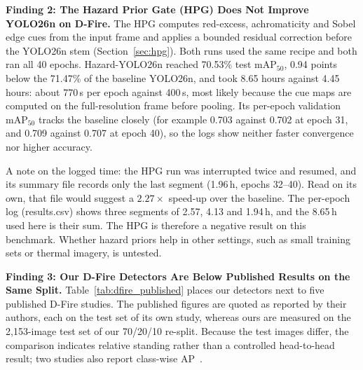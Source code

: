 \documentclass[journal]{IEEEtran}
\begin{document}
\textbf{Finding 2: The Hazard Prior Gate (HPG) Does Not Improve YOLO26n on D-Fire.}
The HPG computes red-excess, achromaticity and Sobel edge cues from the input frame and applies a bounded residual correction before the YOLO26n stem (Section~\ref{sec:hpg}). Both runs used the same recipe and both ran all 40 epochs. Hazard-YOLO26n reached 70.53\% test mAP$_{50}$, 0.94 points below the 71.47\% of the baseline YOLO26n, and took 8.65 hours against 4.45 hours: about 770\,s per epoch against 400\,s, most likely because the cue maps are computed on the full-resolution frame before pooling. Its per-epoch validation mAP$_{50}$ tracks the baseline closely (for example 0.703 against 0.702 at epoch 31, and 0.709 against 0.707 at epoch 40), so the logs show neither faster convergence nor higher accuracy.

A note on the logged time: the HPG run was interrupted twice and resumed, and its summary file records only the last segment (1.96\,h, epochs 32--40). Read on its own, that file would suggest a $2.27\times$ speed-up over the baseline. The per-epoch log (results.csv) shows three segments of 2.57, 4.13 and 1.94\,h, and the 8.65\,h used here is their sum. The HPG is therefore a negative result on this benchmark. Whether hazard priors help in other settings, such as small training sets or thermal imagery, is untested.

\textbf{Finding 3: Our D-Fire Detectors Are Below Published Results on the Same Split.}
Table~\ref{tab:dfire_published} places our detectors next to five published D-Fire studies. The published figures are quoted as reported by their authors, each on the test set of its own study, whereas ours are measured on the 2{,}153-image test set of our 70/20/10 re-split. Because the test images differ, the comparison indicates relative standing rather than a controlled head-to-head result; two studies also report class-wise AP~\cite{venancio2023hybrid,goncalves2024yolo}.
\end{document}
